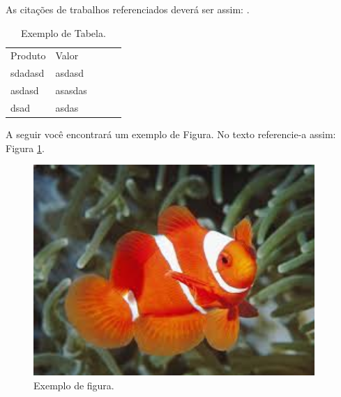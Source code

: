 \documentclass[
	12pt,				%
    oneside,			%
	a4paper,			%
	english,			%
	french,				%
	spanish,			%
	brazil,				%
	]{abntex2}
\begin{document}
As citações de trabalhos referenciados deverá ser assim: \cite{fulano}.


\begin{table}[hbt] %
\begin{center}
\caption{Exemplo de Tabela.} %
\begin{tabular}{|l|l|lll}
\cline{1-2}
Produto & Valor   &  &  &  \\ \cline{1-2}\cline{1-2}
sdadasd & asdasd  &  &  &  \\ \cline{1-2}
asdasd  & asasdas &  &  &  \\ \cline{1-2}
dsad    & asdas   &  &  &  \\ \cline{1-2}
\end{tabular}
\end{center}
\end{table}

A seguir você encontrará um exemplo de Figura. No texto referencie-a assim: Figura \ref{figura1}.

\begin{figure} [hbt] 
\label{figura1} 
\caption{Exemplo de figura.}
\includegraphics[width=0.95\textwidth]{nemo.jpeg} %
\end{figure}
\end{document}
